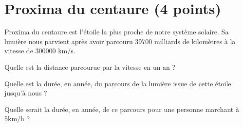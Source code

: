 \section{Proxima du centaure (4 points)}

Proxima du centaure est l'étoile la plus proche de notre système solaire. Sa lumière nous parvient après avoir parcouru \num{39700} milliards de kilomètres à la vitesse de \num{300000} km/s.

\begin{questions}
	\question[1] Quelle est la distance parcourue par la vitesse en un an ?
	\fillwithdottedlines{3cm}
	
	
	\question[1] Quelle est la durée, en année, du parcours de la lumière issue de cette étoile jusqu'à nous ?
	\fillwithdottedlines{4cm}
	
	\question[2] Quelle serait la durée, en année, de ce parcours pour une personne marchant à 5km/h ?
	\fillwithdottedlines{4cm}
\end{questions}